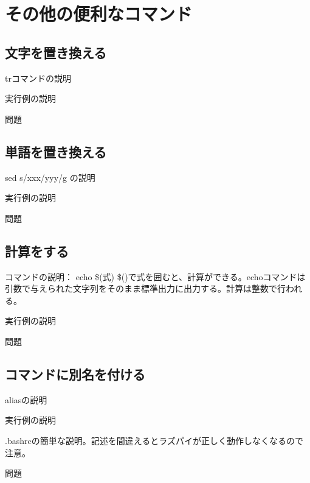 \section{その他の便利なコマンド}

\subsection{文字を置き換える}

trコマンドの説明

実行例の説明

問題

\subsection{単語を置き換える}

sed s/xxx/yyy/g の説明

実行例の説明

問題

\subsection{計算をする}

コマンドの説明： echo \$(式)
\$()で式を囲むと、計算ができる。echoコマンドは引数で与えられた文字列をそのまま標準出力に出力する。計算は整数で行われる。


実行例の説明

問題

\subsection{コマンドに別名を付ける}

aliasの説明

実行例の説明

.bashrcの簡単な説明。記述を間違えるとラズパイが正しく動作しなくなるので注意。

問題
